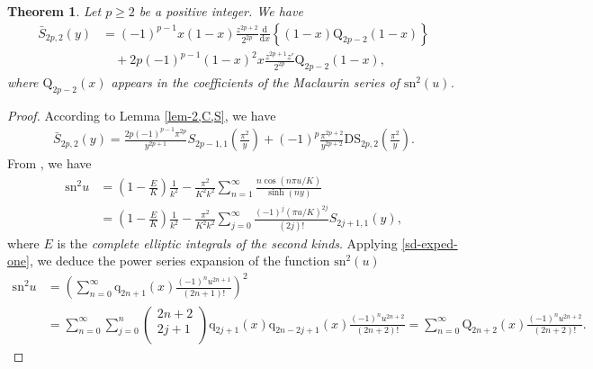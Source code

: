 \documentclass[11pt]{article}
\theoremstyle{plain}
\newtheorem{thm}{Theorem}[section]
\theoremstyle{definition}
\begin{document}
\begin{thm}{\label{barS2p,2}}
Let $p\ge 2$ be a positive integer. We have
\begin{align}\label{barS2p3}
\bar{S}_{2p,2}\left( y \right)& =\left( -1 \right) ^{p-1}x\left( 1-x \right) \frac{z^{2p+2}}{2^{2p}}\frac{\mathrm{d}}{\mathrm{d}x}\left\{ \left( 1-x \right) \mathrm{Q}_{2p-2}\left( 1-x \right) \right\}
\nonumber\\
&\quad+2p\left( -1 \right) ^{p-1}\left( 1-x \right) ^2x\frac{z^{2p+1}z'}{2^{2p}}\mathrm{Q}_{2p-2}\left( 1-x \right),
\end{align}
where $\text{Q}_{2p-2}\left( x \right)$ appears in the coefficients of the Maclaurin series of $\mathrm{sn}^2\left( u \right)$.
\end{thm}
\begin{proof}
According to Lemma \ref{lem-2,C,S}, we have
\begin{align}\label{thm5.3-proof-begin-1}
\bar{S}_{2p,2}\left( y \right) =\frac{2p\left( -1 \right) ^{p-1}\pi ^{2p}}{y^{2p+1}}S_{2p-1,1}\left( \frac{\pi ^2}{y} \right) +\left( -1 \right) ^p\frac{\pi ^{2p+2}}{y^{2p+2}}\text{DS}_{2p,2}\left( \frac{\pi ^2}{y} \right).
\end{align}
From \cite{Greenhill1892}, we have
\begin{align*}
\mathrm{sn}^{2}u&=\left(1 - \frac{E}{K}\right)\frac{1}{k^{2}} - \frac{\pi^{2}}{K^{2}k^{2}}\sum_{n = 1}^{\infty}\frac{n\cos(n\pi u / K)}{\sinh(ny)}\\
&=\left(1 - \frac{E}{K}\right)\frac{1}{k^{2}} - \frac{\pi^{2}}{K^{2}k^{2}}\sum_{j = 0}^{\infty}\frac{(-1)^{j}(\pi u / K)^{2j}}{(2j)!}S_{2j + 1,1}(y),
\end{align*}
where $E$ is the \emph{complete elliptic integrals of the second kinds}. Applying \eqref{sd-exped-one}, we deduce the power series expansion of the function $\mathrm{sn}^2 (u)$
\begin{align*}
\mathrm{sn}^2u&=\left( \sum_{n=0}^{\infty}{\mathrm{q}_{2n+1}\left( x \right) \frac{\left( -1 \right) ^nu^{2n+1}}{\left( 2n+1 \right) !}} \right) ^2
\\
&=\sum_{n=0}^{\infty}{\sum_{j=0}^n{\left( \begin{array}{c}
			2n+2\\
			2j+1\\
		\end{array} \right) \mathrm{q}_{2j+1}\left( x \right) \mathrm{q}_{2n-2j+1}\left( x \right)}}\frac{\left( -1 \right) ^nu^{2n+2}}{\left( 2n+2 \right) !}=\sum_{n=0}^{\infty}{\mathrm{Q}_{2n+2}\left( x \right)}\frac{\left( -1 \right) ^nu^{2n+2}}{\left( 2n+2 \right) !}.

\end{align*}
\end{proof}
\end{document}
